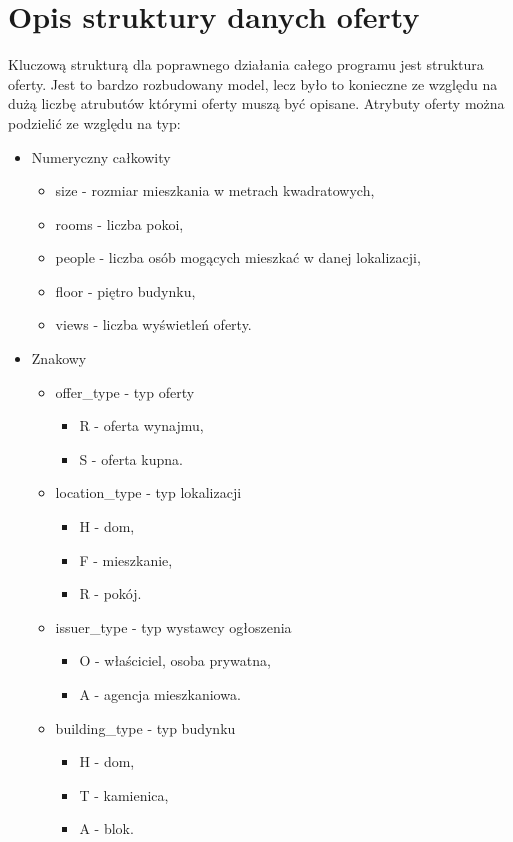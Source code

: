 \section{Opis struktury danych oferty}
\label{sec:strukturaOferty}
Kluczową strukturą dla poprawnego działania całego programu jest struktura oferty. Jest to bardzo rozbudowany model, lecz było to konieczne ze względu na dużą liczbę atrubutów którymi oferty muszą być opisane. Atrybuty oferty można podzielić ze względu na typ:
\begin{itemize}
\item Numeryczny całkowity
\begin{itemize}
\item size - rozmiar mieszkania w metrach kwadratowych,
\item rooms - liczba pokoi,
\item people - liczba osób mogących mieszkać w danej lokalizacji,
\item floor - piętro budynku,
\item views - liczba wyświetleń oferty.
\end{itemize}
\item Znakowy
\begin{itemize}
\item offer\_type - typ oferty
\begin{itemize}
\item R - oferta wynajmu,
\item S - oferta kupna.
\end{itemize}
\item location\_type - typ lokalizacji 
\begin{itemize}
\item H - dom,
\item F - mieszkanie,
\item R - pokój.
\end{itemize}
\item issuer\_type - typ wystawcy ogłoszenia 
\begin{itemize}
\item O - właściciel, osoba prywatna,
\item A - agencja mieszkaniowa.
\end{itemize}
\item building\_type - typ budynku
\begin{itemize}
\item H - dom,
\item T - kamienica,
\item A - blok.
\end{itemize}

\end{itemize}
\end{itemize}
